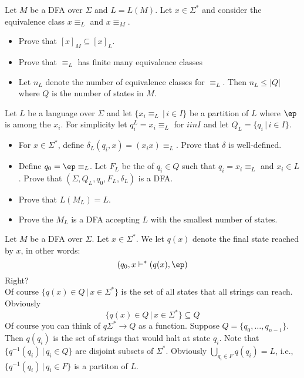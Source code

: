 \begin{ex}
 Let $M$ be a DFA over $\Sigma$ and $L = L(M)$.
 Let $x \in \Sigma^*$ and consider the equivalence class
 $x\equiv_L$ and $x \equiv_M$.
 \begin{itemize}
  \item Prove that $[x]_M \subseteq [x]_L$.
  \item Prove that $\equiv_L$ has finite many equivalence classes
  \item Let $n_L$ denote the number of equivalence classes for
  $\equiv_L$. Then $n_L \leq |Q|$ where $Q$ is the number of
  states in $M$.
 \end{itemize}
\end{ex}

\begin{ex}
 Let $L$ be a language over $\Sigma$ and let $\{x_i\equiv_L \,|\, i \in I
 \}$ be a partition of $L$ where $\ep$ is among the $x_i$.
 For simplicity let $q_i^L =
 x_i\equiv_L$ for $i in I$ and let $Q_L = \{q_i \,|\, i \in I\}$.
 \begin{itemize}
  \item For $x \in \Sigma^*$, define $\delta_L(q_i,x) =
  (x_ix)\equiv_L$. Prove that $\delta$ is well-defined.
  \item Define $q_0 = \ep\equiv_L$. Let $F_L$ be the of $q_i \in Q$
  such that $q_i = x_i \equiv_L$ and $x_i \in L$. Prove that
  $(\Sigma, Q_L, q_0, F_L, \delta_L)$ is a DFA.
  \item Prove that $L(M_L) = L$.
  \item Prove the $M_L$ is a DFA accepting $L$ with the smallest
  number of states.
 \end{itemize}
\end{ex}

Let $M$ be a DFA over $\Sigma$. Let $x \in \Sigma^*$. We let
$q(x)$ denote the final state reached by $x$, in other words:
\[
 (q_0,x \vdash^* (q(x),\ep)
\]
Right?
\\

Of course $\{q(x) \in Q \,|\, x \in \Sigma^* \}$ is the set of all
states that all strings can reach. Obviously
\[
 \{q(x) \in Q \,|\, x \in \Sigma^* \} \subseteq Q
\]
Of course you can think of $q \Sigma^* \rightarrow Q$ as a
function. Suppose $Q = \{q_0, \ldots, q_{n-1}\}$. Then $q(q_i)$ is
the set of strings that would halt at state $q_i$. Note that
$\{q^{-1}(q_i) \,|\, q_i \in Q\}$ are disjoint subsets of
$\Sigma^*$. Obviously $\bigcup_{q_i \in F} q(q_i) = L$, i.e.,
$\{q^{-1}(q_i) \,|\, q_i \in F\}$ is a partiton of $L$.
\\

